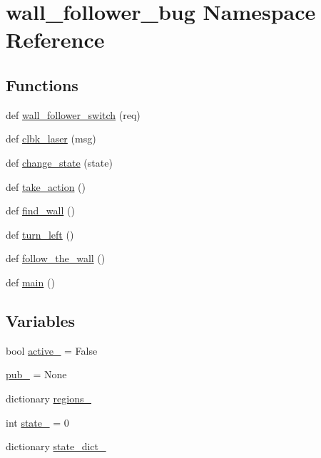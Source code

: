 \hypertarget{namespacewall__follower__bug}{}\section{wall\+\_\+follower\+\_\+bug Namespace Reference}
\label{namespacewall__follower__bug}
\subsection*{Functions}
\begin{DoxyCompactItemize}
\item 
def \hyperlink{namespacewall__follower__bug_a5d0c2e78758008504a9749cab054fbd0}{wall\+\_\+follower\+\_\+switch} (req)
\item 
def \hyperlink{namespacewall__follower__bug_aa2ca4880ece52422950bb42e57017f06}{clbk\+\_\+laser} (msg)
\item 
def \hyperlink{namespacewall__follower__bug_af28c29694a6ed8d452c60419577f90c9}{change\+\_\+state} (state)
\item 
def \hyperlink{namespacewall__follower__bug_a500d9cb441c3d49d1e5f5820c8c9b19c}{take\+\_\+action} ()
\item 
def \hyperlink{namespacewall__follower__bug_af945cfe3d9481312d764046030fbc5dd}{find\+\_\+wall} ()
\item 
def \hyperlink{namespacewall__follower__bug_a8c6b06f54645f2626d5b4c79b5af5451}{turn\+\_\+left} ()
\item 
def \hyperlink{namespacewall__follower__bug_af3fec46bbe697b382dc6522a21cab3ed}{follow\+\_\+the\+\_\+wall} ()
\item 
def \hyperlink{namespacewall__follower__bug_acb9b0b720d2f5af0831f00f23d676476}{main} ()
\end{DoxyCompactItemize}
\subsection*{Variables}
\begin{DoxyCompactItemize}
\item 
bool \hyperlink{namespacewall__follower__bug_aae52d8b35c7f252ef4da619eb924a1eb}{active\+\_\+} = False
\item 
\hyperlink{namespacewall__follower__bug_af857c0a3244763f5e201f37452696767}{pub\+\_\+} = None
\item 
dictionary \hyperlink{namespacewall__follower__bug_acb8af6367eac655a9899a840a3c89eae}{regions\+\_\+}
\item 
int \hyperlink{namespacewall__follower__bug_a867cf414a3d42354a718497573927c3f}{state\+\_\+} = 0
\item 
dictionary \hyperlink{namespacewall__follower__bug_ac57f08afcea951e9b48786db2bda0516}{state\+\_\+dict\+\_\+}
\end{DoxyCompactItemize}


